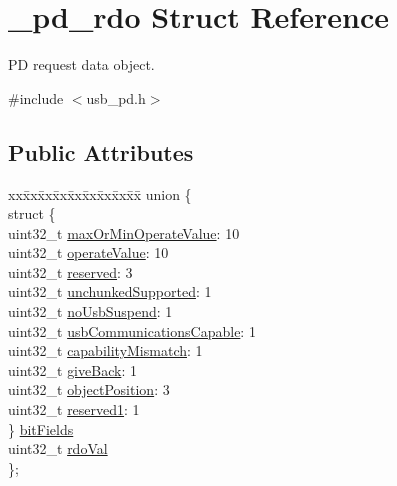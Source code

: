 \hypertarget{struct__pd__rdo}{\section{\-\_\-pd\-\_\-rdo Struct Reference}
\label{struct__pd__rdo}
}


P\-D request data object.  




{\ttfamily \#include $<$usb\-\_\-pd.\-h$>$}

\subsection*{Public Attributes}
\begin{DoxyCompactItemize}
\item 
\begin{tabbing}
xx\=xx\=xx\=xx\=xx\=xx\=xx\=xx\=xx\=\kill
union \{\\
\>struct \{\\
\>\>uint32\_t \hyperlink{struct__pd__rdo_a75142d4da1d2a5049e134f771854ff7b}{maxOrMinOperateValue}: 10\\
\>\>uint32\_t \hyperlink{struct__pd__rdo_ace7bc599e359ab9c6e626b0b0cdb5359}{operateValue}: 10\\
\>\>uint32\_t \hyperlink{struct__pd__rdo_ad10d5e670fae5dd17c3ec06a8e994ea7}{reserved}: 3\\
\>\>uint32\_t \hyperlink{struct__pd__rdo_ab37db01bb9fe1af93aacc97242516364}{unchunkedSupported}: 1\\
\>\>uint32\_t \hyperlink{struct__pd__rdo_a85b57e63d9528131d0092a43111b2a98}{noUsbSuspend}: 1\\
\>\>uint32\_t \hyperlink{struct__pd__rdo_a3276a3edcd2e5ee3e9f17d9cca8f3ea2}{usbCommunicationsCapable}: 1\\
\>\>uint32\_t \hyperlink{struct__pd__rdo_afa835644625bbc35646580cb9bbd9b66}{capabilityMismatch}: 1\\
\>\>uint32\_t \hyperlink{struct__pd__rdo_a82acd4a018e44108ae1cb59e1da734b2}{giveBack}: 1\\
\>\>uint32\_t \hyperlink{struct__pd__rdo_a593d7f2473f5f2ccd44e7a1a71bd6df5}{objectPosition}: 3\\
\>\>uint32\_t \hyperlink{struct__pd__rdo_ac02715c88773bd4b67ab4a24aa98a481}{reserved1}: 1\\
\>\} \hyperlink{struct__pd__rdo_acd03d551b682b870d0e30be5819d013e}{bitFields}\\
\>uint32\_t \hyperlink{struct__pd__rdo_a66cd4e249b3284e7d1acc9714fa0ce0a}{rdoVal}\\
\}; \\

\end{tabbing}\end{DoxyCompactItemize}


